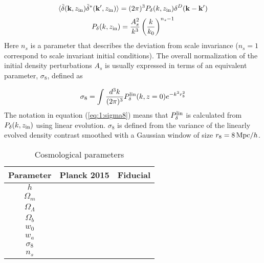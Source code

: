 \begin{equation}
\label{eq:1:initial-cond}
\langle\tilde{\delta}(\mathbf{k},z_{\rm in})\tilde{\delta}^*(\mathbf{k}',z_{\rm in})\rangle = (2\pi)^3 P_\delta(k,z_{\rm in})\delta^D(\mathbf{k}-\mathbf{k}')
\end{equation}
%
\begin{equation}
\label{eq:1:initial-ps}
P_\delta(k,z_{\rm in}) = \frac{A^2_s}{k^3}\left(\frac{k}{k_0}\right)^{n_s-1}
\end{equation}
%
Here $n_s$ is a parameter that describes the deviation from scale invariance ($n_s=1$ correspond to scale invariant initial conditions). The overall normalization of the initial density perturbations $A_s$ is usually expressed in terms of an equivalent parameter, $\sigma_8$, defined as 

\begin{equation}
\label{eq:1:sigma8}
\sigma_8 = \int \frac{d^3k}{(2\pi)^3} P^{\rm lin}_\delta(k,z=0)e^{-k^2 r_8^2}
\end{equation} 
%
The notation in equation (\ref{eq:1:sigma8}) means that $P_\delta^{\rm lin}$ is calculated from $P_\delta(k,z_{\rm in})$ using linear evolution. $\sigma_8$ is defined from the variance of the linearly evolved density contrast smoothed with a Gaussian window of size $r_8=8\,{\rm Mpc}/h$. 

\begin{table}
\begin{center}
\begin{tabular}[h]{c|c|c}

\textbf{Parameter} & \textbf{Planck 2015} & \textbf{Fiducial} \\ \hline 

$h$ & & \\
$\Omega_m$ & & \\
$\Omega_\Lambda$ & & \\
$\Omega_b$ & & \\
$w_0$ & & \\
$w_a$ & & \\
$\sigma_8$ & & \\
$n_s$ & & \\

\end{tabular}
\end{center}
\caption{Cosmological parameters}
\label{tab:1:cosmopar}
\end{table}

